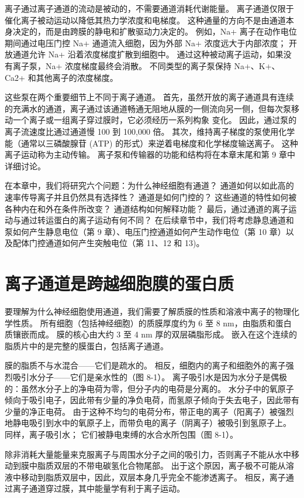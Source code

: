 离子通过离子通道的流动是被动的，不需要通道消耗代谢能量。 
离子通道仅限于催化离子被动运动以降低其热力学浓度和电梯度。 
这种通量的方向不是由通道本身决定的，而是由跨膜的静电和扩散驱动力决定的。 
例如，Na+ 离子在动作电位期间通过电压门控 Na+ 通道流入细胞，因为外部 Na+ 浓度远大于内部浓度； 开放通道允许 Na+ 沿着浓度梯度扩散到细胞中。 
通过这种被动离子运动，如果没有离子泵，Na+ 浓度梯度最终会消散。 
不同类型的离子泵保持 Na+、K+、Ca2+ 和其他离子的浓度梯度。


这些泵在两个重要细节上不同于离子通道。 
首先，虽然开放的离子通道具有连续的充满水的通道，离子通过该通道畅通无阻地从膜的一侧流向另一侧，但每次泵移动一个离子或一组离子穿过膜时，它必须经历一系列构象 变化。 
因此，通过泵的离子流速度比通过通道慢 100 到 100,000 倍。 
其次，维持离子梯度的泵使用化学能（通常以三磷酸腺苷 (ATP) 的形式）来逆着电梯度和化学梯度输送离子。 
这种离子运动称为主动传输。 
离子泵和传输器的功能和结构将在本章末尾和第 9 章中详细讨论。


在本章中，我们将研究六个问题：为什么神经细胞有通道？ 
通道如何以如此高的速率传导离子并且仍然具有选择性？ 
通道是如何门控的？ 
这些通道的特性如何被各种内在和外在条件所改变？ 
通道结构如何解释功能？ 
最后，通过通道的离子运动与通过转运蛋白的离子运动有何不同？ 
在后续章节中，我们将考虑静息通道和泵如何产生静息电位（第 9 章）、电压门控通道如何产生动作电位（第 10 章）以及配体门控通道如何产生突触电位（第 11、12 和 13)。


\section{离子通道是跨越细胞膜的蛋白质}
要理解为什么神经细胞使用通道，我们需要了解质膜的性质和溶液中离子的物理化学性质。 
所有细胞（包括神经细胞）的质膜厚度约为 6 至 8 nm，由脂质和蛋白质镶嵌而成。 
膜的核心由大约 3 至 4 nm 厚的双层磷脂形成。 
嵌入在这个连续的脂质片中的是完整的膜蛋白，包括离子通道。


膜的脂质不与水混合——它们是疏水的。 
相反，细胞内的离子和细胞外的离子强烈吸引水分子——它们是亲水性的（图 8-1）。 
离子吸引水是因为水分子是偶极的：虽然水分子上的净电荷为零，但分子内的电荷是分离的。 
水分子中的氧原子倾向于吸引电子，因此带有少量的净负电荷，而氢原子倾向于失去电子，因此带有少量的净正电荷。 
由于这种不均匀的电荷分布，带正电的离子（阳离子）被强烈地静电吸引到水中的氧原子上，而带负电的离子（阴离子）被吸引到氢原子上。 
同样，离子吸引水； 它们被静电束缚的水合水所包围（图 8-1）。


除非消耗大量能量来克服离子与周围水分子之间的吸引力，否则离子不能从水中移动到膜中脂质双层的不带电碳氢化合物尾部。 
出于这个原因，离子极不可能从溶液中移动到脂质双层中，因此，双层本身几乎完全不能渗透离子。 
相反，离子通过离子通道穿过膜，其中能量学有利于离子运动。


